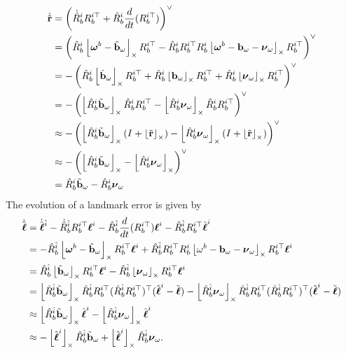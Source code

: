 \begin{align*}
    \dot{\tilde{\rbf}}
        &= \left(\dot{\hat{R}}_b^i R_b^{i\top} + \hat{R}_b^i\frac{d}{dt}(R_b^{i\top})\right)^\vee \\
        &= \left(\hat{R}_b^i\ss{\omegabf^b-\hat{\bbf}_\omega} R_b^{i\top} - \hat{R}_b^iR_b^{i\top} R_b^i \ss{\omegabf^b-\bbf_\omega-\nubf_\omega} R_b^{i\top}\right)^\vee \\
        &= -\left(\hat{R}_b^i\ss{\hat{\bbf}_\omega} R_b^{i\top} + \hat{R}_b^i \ss{\bbf_\omega} R_b^{i\top} + \hat{R}_b^i \ss{\nubf_\omega} R_b^{i\top}\right)^\vee \\
        &= -\left(\ss{\hat{R}_b^i\tilde{\bbf}_\omega} \hat{R}_b^i R_b^{i\top} - \ss{\hat{R}_b^i\nubf_\omega} \hat{R}_b^i R_b^{i\top}\right)^\vee \\        
        &\approx -\left(\ss{\hat{R}_b^i\tilde{\bbf}_\omega} (I + \ss{\tilde{\rbf}}) - \ss{\hat{R}_b^i\nubf_\omega} (I + \ss{\tilde{\rbf}}) \right)^\vee \\
        &\approx -\left(\ss{\hat{R}_b^i\tilde{\bbf}_\omega} - \ss{\hat{R}_b^i\nubf_\omega} \right)^\vee \\
        &= \hat{R}_b^i\tilde{\bbf}_\omega - \hat{R}_b^i\nubf_\omega
\end{align*}
The evolution of a landmark error is given by
\begin{align*}
    \dot{\tilde{\ellbf}} &= \dot{\hat{\ellbf}}^{\hat{i}}-\dot{\hat{R}}_b^{\hat{i}} R_b^{i\top}\ellbf^i - \hat{R}_b^{\hat{i}}\frac{d}{dt}(R_b^{i\top}) \ellbf^i - \hat{R}_b^{\hat{i}}R_b^{i\top} \dot{\ellbf}^i \\
     &=  -\hat{R}_b^{\hat{i}}\ss{\omegabf^b-\hat{\bbf}_\omega} R_b^{i\top} \ellbf^i + \hat{R}_b^{\hat{i}} R_b^{i\top} R_b^i\ss{\omega^b-\bbf_\omega-\nubf_\omega} R_b^{i\top} \ellbf^i  \\
     &=  \hat{R}_b^{\hat{i}}\ss{\tilde{\bbf}_\omega} R_b^{i\top} \ellbf^i - \hat{R}_b^{\hat{i}}\ss{\nubf_\omega} R_b^{i\top} \ellbf^i  \\
     &=  \ss{\hat{R}_b^{\hat{i}}\tilde{\bbf}_\omega} \hat{R}_b^{\hat{i}}R_b^{i\top} (\hat{R}_b^{\hat{i}}R_b^{i\top})^\top (\hat{\ellbf}^i - \tilde{\ellbf}) - \ss{\hat{R}_b^{\hat{i}}\nubf_\omega} \hat{R}_b^{\hat{i}}R_b^{i\top} (\hat{R}_b^{\hat{i}}R_b^{i\top})^\top (\hat{\ellbf}^i - \tilde{\ellbf})  \\
     &\approx  \ss{\hat{R}_b^{\hat{i}}\tilde{\bbf}_\omega} \hat{\ellbf}^i - \ss{\hat{R}_b^{\hat{i}}\nubf_\omega} \hat{\ellbf}^i  \\
     &\approx  -\ss{\hat{\ellbf}^i} \hat{R}_b^{\hat{i}} \tilde{\bbf}_\omega + \ss{\hat{\ellbf}^i} \hat{R}_b^{\hat{i}} \nubf_\omega.
\end{align*}
